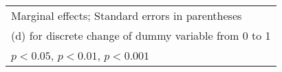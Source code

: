 {\begin{tabular}{l*{72}{c}}
\hline\hline
\multicolumn{73}{l}{\footnotesize Marginal effects; Standard errors in parentheses}\\
\multicolumn{73}{l}{\footnotesize  (d) for discrete change of dummy variable from 0 to 1}\\
\multicolumn{73}{l}{\footnotesize \sym{*} \(p<0.05\), \sym{**} \(p<0.01\), \sym{***} \(p<0.001\)}\\
\end{tabular}
}
